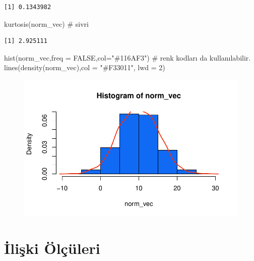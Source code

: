 \documentclass[
  letterpaper,
  DIV=11,
  numbers=noendperiod]{scrreprt}
\newenvironment{Shaded}{\begin{snugshade}}{\end{snugshade}}
\newcommand{\AttributeTok}[1]{\textcolor[rgb]{0.40,0.45,0.13}{#1}}
\newcommand{\CommentTok}[1]{\textcolor[rgb]{0.37,0.37,0.37}{#1}}
\newcommand{\ConstantTok}[1]{\textcolor[rgb]{0.56,0.35,0.01}{#1}}
\newcommand{\DecValTok}[1]{\textcolor[rgb]{0.68,0.00,0.00}{#1}}
\newcommand{\FunctionTok}[1]{\textcolor[rgb]{0.28,0.35,0.67}{#1}}
\newcommand{\NormalTok}[1]{\textcolor[rgb]{0.00,0.23,0.31}{#1}}
\newcommand{\StringTok}[1]{\textcolor[rgb]{0.13,0.47,0.30}{#1}}
\begin{document}
\begin{verbatim}
[1] 0.1343982
\end{verbatim}

\begin{Shaded}
\begin{Highlighting}[]
\FunctionTok{kurtosis}\NormalTok{(norm\_vec) }\CommentTok{\# sivri}
\end{Highlighting}
\end{Shaded}

\begin{verbatim}
[1] 2.925111
\end{verbatim}

\begin{Shaded}
\begin{Highlighting}[]
\FunctionTok{hist}\NormalTok{(norm\_vec,}\AttributeTok{freq =} \ConstantTok{FALSE}\NormalTok{,}\AttributeTok{col=}\StringTok{"\#116AF3"}\NormalTok{) }\CommentTok{\# renk kodları da kullanılabilir.}
\FunctionTok{lines}\NormalTok{(}\FunctionTok{density}\NormalTok{(norm\_vec),}\AttributeTok{col =} \StringTok{"\#F33011"}\NormalTok{, }\AttributeTok{lwd =} \DecValTok{2}\NormalTok{)}
\end{Highlighting}
\end{Shaded}

\begin{figure}[H]

{\centering \includegraphics{statistics_files/figure-pdf/unnamed-chunk-10-3.pdf}

}

\end{figure}

\hypertarget{iliux15fki-uxf6luxe7uxfcleri}{%
\section*{İlişki Ölçüleri}\label{iliux15fki-uxf6luxe7uxfcleri}}
\end{document}
